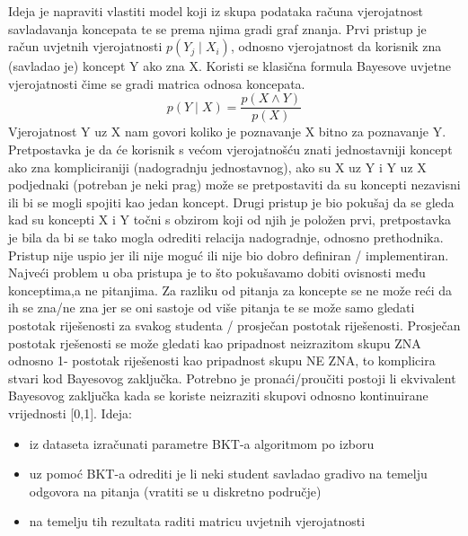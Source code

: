 \documentclass[times, utf8,projekt]{fer}
\begin{document}
	Ideja je napraviti vlastiti model koji iz skupa podataka računa vjerojatnost savladavanja koncepata te se prema njima gradi graf znanja.\newline
	Prvi pristup je račun uvjetnih vjerojatnosti $p(Y_j\mid X_i)$, odnosno vjerojatnost da korisnik zna (savladao je) koncept Y ako zna X. Koristi se klasična formula Bayesove uvjetne vjerojatnosti čime se gradi matrica odnosa koncepata.
	\begin{equation}
		p(Y \mid X)=\frac{p(X \wedge Y)}{p(X)}
	\end{equation}
	\newline Vjerojatnost Y uz X nam govori koliko je poznavanje X bitno za poznavanje Y. Pretpostavka je da će korisnik s većom vjerojatnošću znati jednostavniji koncept ako zna kompliciraniji (nadogradnju jednostavnog), ako su X uz Y i Y uz X podjednaki (potreban je neki prag) može se pretpostaviti da su koncepti nezavisni ili bi se mogli spojiti kao jedan koncept. \newline
	Drugi pristup je bio pokušaj da se gleda kad su koncepti X i Y točni s obzirom koji od njih je položen prvi, pretpostavka je bila da bi se tako mogla odrediti relacija nadogradnje, odnosno prethodnika. Pristup nije uspio jer ili nije moguć ili nije bio dobro definiran / implementiran.\newline
	Najveći problem u oba pristupa je to što pokušavamo dobiti ovisnosti među konceptima,a ne pitanjima. Za razliku od pitanja za koncepte se ne može reći da ih se zna/ne zna jer se oni sastoje od više pitanja te se može samo gledati postotak riješenosti za svakog studenta / prosječan postotak riješenosti. Prosječan postotak rješenosti se može gledati kao pripadnost neizrazitom skupu ZNA odnosno 1- postotak riješenosti kao pripadnost skupu NE ZNA, to komplicira stvari kod Bayesovog zaključka. Potrebno je pronaći/proučiti postoji li ekvivalent Bayesovog zaključka kada se koriste neizraziti skupovi odnosno kontinuirane vrijednosti [0,1].\newline
	Ideja:
	\begin{itemize}
		\item iz dataseta izračunati parametre BKT-a algoritmom po izboru
		\item uz pomoć BKT-a odrediti je li neki student savladao gradivo na temelju odgovora na pitanja (vratiti se u diskretno područje)
		\item na temelju tih rezultata raditi matricu uvjetnih vjerojatnosti\newline
	\end{itemize}
\end{document}
